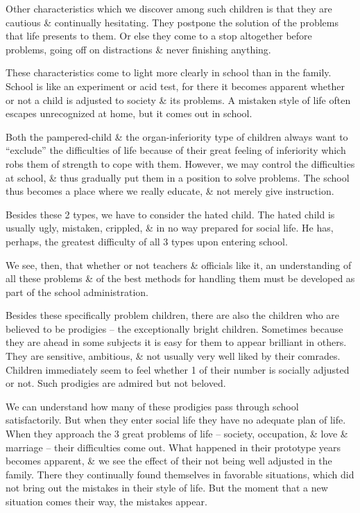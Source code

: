 \documentclass{article}
\begin{document}
Other characteristics which we discover among such children is that they are cautious \& continually hesitating. They postpone the solution of the problems that life presents to them. Or else they come to a stop altogether before problems, going off on distractions \& never finishing anything.

These characteristics come to light more clearly in school than in the family. School is like an experiment or acid test, for there it becomes apparent whether or not a child is adjusted to society \& its problems. A mistaken style of life often escapes unrecognized at home, but it comes out in school.

Both the pampered-child \& the organ-inferiority type of children always want to ``exclude'' the difficulties of life because of their great feeling of inferiority which robs them of strength to cope with them. However, we may control the difficulties at school, \& thus gradually put them in a position to solve problems. The school thus becomes a place where we really educate, \& not merely give instruction.

Besides these 2 types, we have to consider the hated child. The hated child is usually ugly, mistaken, crippled, \& in no way prepared for social life. He has, perhaps, the greatest difficulty of all 3 types upon entering school.

We see, then, that whether or not teachers \& officials like it, an understanding of all these problems \& of the best methods for handling them must be developed as part of the school administration.

Besides these specifically problem children, there are also the children who are believed to be prodigies -- the exceptionally bright children. Sometimes because they are ahead in some subjects it is easy for them to appear brilliant in others. They are sensitive, ambitious, \& not usually very well liked by their comrades. Children immediately seem to feel whether 1 of their number is socially adjusted or not. Such prodigies are admired but not beloved.

We can understand how many of these prodigies pass through school satisfactorily. But when they enter social life they have no adequate plan of life. When they approach the 3 great problems of life -- society, occupation, \& love \& marriage -- their difficulties come out. What happened in their prototype years becomes apparent, \& we see the effect of their not being well adjusted in the family. There they continually found themselves in favorable situations, which did not bring out the mistakes in their style of life. But the moment that a new situation comes their way, the mistakes appear.
\end{document}
